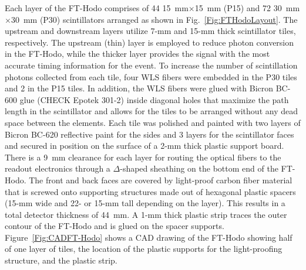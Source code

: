 Each layer of the FT-Hodo comprises of 44 15~mm$\times$15~mm (P15) and 72 30~mm$\times$30~mm (P30)
scintillators arranged as shown in Fig.~\ref{Fig:FTHodoLayout}. The upstream and downstream layers utilize 7-mm
and 15-mm thick scintillator tiles, respectively. The upstream (thin) layer is employed to reduce photon conversion in
the FT-Hodo, while the thicker layer provides the signal with the most accurate timing information for the event. To
increase the number of scintillation photons collected from each tile, four WLS fibers were embedded in the P30
tiles and 2 in the P15 tiles. In addition, the WLS fibers were glued with Bicron BC-600 glue (CHECK Epotek 301-2)
inside diagonal holes that maximize the path length in the scintillator and allows for the tiles to be arranged without
any dead space between the elements. Each tile was polished and painted with two layers of Bicron BC-620 reflective
paint for the sides and 3 layers for the scintillator faces and secured in position on the surface of a 2-mm thick
plastic support board. There is a 9~mm clearance for each layer for routing the optical fibers to the readout
electronics through a $\Delta$-shaped sheathing on the bottom end of the FT-Hodo. The front and back faces are
covered by light-proof carbon fiber material that is screwed onto supporting structures made out of hexagonal
plastic spacers (15-mm wide and 22- or 15-mm tall depending on the layer). This results in a total detector thickness
of 44~mm. A 1-mm thick plastic strip traces the outer contour of the FT-Hodo and is glued on the spacer supports.
Figure~\ref{Fig:CADFT-Hodo} shows a CAD drawing of the FT-Hodo showing half of one layer of tiles, the location
of the plastic supports for the light-proofing structure, and the plastic strip.  

